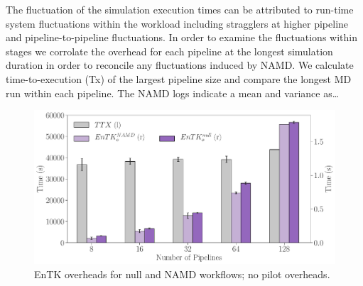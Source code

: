The fluctuation of the simulation execution times can be attributed to
run-time system fluctuations within the workload including stragglers at
higher pipeline and pipeline-to-pipeline fluctuations. In order to examine
the fluctuations within stages we corrolate the overhead for each pipeline at
the longest simulation duration in order to reconcile any fluctuations
induced by NAMD\@. We calculate time-to-execution (Tx) of the largest
pipeline size and compare the longest MD run within each pipeline. The NAMD
logs indicate a mean and variance as\ldots


\begin{figure}[!htbp]
  \begin{minipage}[b]{0.49\textwidth}
  \centering
  \includegraphics[width=\textwidth]{FIGURES/namd_null_workload_overheads.pdf}
  \end{minipage}
  \caption{EnTK overheads for null and NAMD workflows; no pilot overheads.}\label{fig:namd_logs}
\end{figure}


